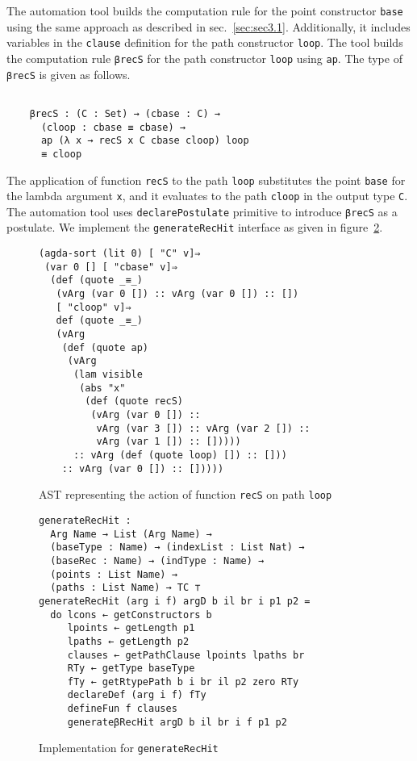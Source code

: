 \documentclass[sigplan,10pt]{acmart}
\begin{document}
The automation tool builds the computation rule for the point constructor {\tt base} using the same approach as described in sec.~\ref{sec:sec3.1}. Additionally, it includes variables in the {\tt clause} definition for the path constructor {\tt loop}. The tool builds the computation rule {\tt βrecS} for the path constructor {\tt loop} using {\tt ap}. The type of {\tt βrecS} is given as follows.

\begin{center}
\begingroup
\begin{BVerbatim}

    βrecS : (C : Set) → (cbase : C) → 
      (cloop : cbase ≡ cbase) → 
      ap (λ x → recS x C cbase cloop) loop 
      ≡ cloop
\end{BVerbatim}
\endgroup
\end{center}

The application of function {\tt recS} to the path {\tt loop} substitutes the point {\tt base} for the lambda argument {\tt x}, and it evaluates to the path {\tt cloop} in the output type {\tt C}. The automation tool uses {\tt declarePostulate} primitive to introduce {\tt βrecS} as a postulate. We implement the {\tt generateRecHit} interface as given in figure~\ref{fig:generateRecHit}.

\begin{figure}
\begin{center}
\begingroup
\fontsize{7pt}{9pt}\selectfont
\begin{Verbatim}
(agda-sort (lit 0) [ "C" v]⇒
 (var 0 [] [ "cbase" v]⇒
  (def (quote _≡_)
   (vArg (var 0 []) :: vArg (var 0 []) :: [])
   [ "cloop" v]⇒
   def (quote _≡_)
   (vArg
    (def (quote ap)
     (vArg
      (lam visible
       (abs "x"
        (def (quote recS)
         (vArg (var 0 []) ::
          vArg (var 3 []) :: vArg (var 2 []) :: 
          vArg (var 1 []) :: []))))
      :: vArg (def (quote loop) []) :: []))
    :: vArg (var 0 []) :: []))))
\end{Verbatim}
\endgroup
\end{center}
\caption{AST representing the action of function {\tt recS} on path {\tt loop}}
\label{fig:ast-beta-f}
\end{figure}
\normalsize

\begin{figure}
\begin{center}
\begingroup
\fontsize{7pt}{9pt}\selectfont
\begin{Verbatim}
generateRecHit : 
  Arg Name → List (Arg Name) →
  (baseType : Name) → (indexList : List Nat) →
  (baseRec : Name) → (indType : Name) →
  (points : List Name) → 
  (paths : List Name) → TC ⊤
generateRecHit (arg i f) argD b il br i p1 p2 =
  do lcons ← getConstructors b
     lpoints ← getLength p1
     lpaths ← getLength p2
     clauses ← getPathClause lpoints lpaths br
     RTy ← getType baseType
     fTy ← getRtypePath b i br il p2 zero RTy
     declareDef (arg i f) fTy
     defineFun f clauses
     generateβRecHit argD b il br i f p1 p2
\end{Verbatim}
\endgroup
\end{center}
\caption{Implementation for {\tt generateRecHit}}
\label{fig:generateRecHit}
\end{figure}
\normalsize
\end{document}
